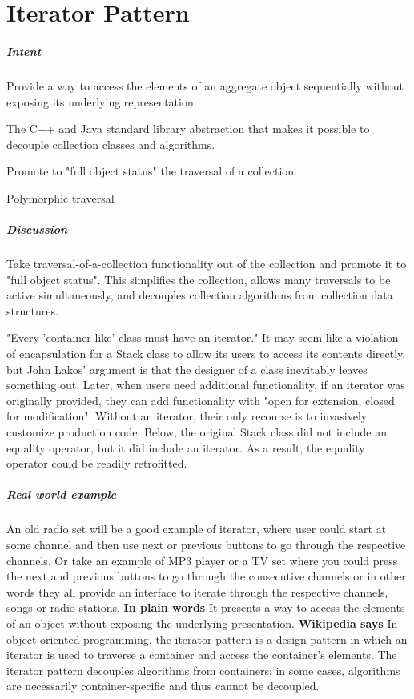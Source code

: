 \documentclass{book}
\begin{document}
\chapter{Iterator Pattern}\label{IteratorPattern}
\paragraph{Intent}

    Provide a way to access the elements of an aggregate object sequentially without exposing its underlying representation.

    The C++ and Java standard library abstraction that makes it possible to decouple collection classes and algorithms.

    Promote to "full object status" the traversal of a collection.

    Polymorphic traversal
\paragraph{Discussion}
Take traversal-of-a-collection functionality out of the collection and promote it to "full object status".
This simplifies the collection, allows many traversals to be active simultaneously, and decouples collection algorithms from collection data structures.

"Every 'container-like' class must have an iterator." It may seem like a violation of encapsulation for a Stack class 
to allow its users to access its contents directly, but John Lakos' argument is that the designer of a class inevitably leaves something out.
Later, when users need additional functionality, if an iterator was originally provided, they can add functionality with "open for extension, closed for modification".
Without an iterator, their only recourse is to invasively customize production code.
Below, the original Stack class did not include an equality operator, but it did include an iterator.
As a result, the equality operator could be readily retrofitted.

\paragraph{Real world example}
An old radio set will be a good example of iterator, where user could start at some channel and then use next or previous buttons to go through the respective channels.
Or take an example of MP3 player or a TV set where you could press the next and previous buttons to go through the consecutive channels or in other words they all
provide an interface to iterate through the respective channels, songs or radio stations.
\textbf{In plain words}
It presents a way to access the elements of an object without exposing the underlying presentation.
\textbf{Wikipedia says}
In object-oriented programming, the iterator pattern is a design pattern in which an iterator is used to traverse a container and access the container's elements.
The iterator pattern decouples algorithms from containers; in some cases, algorithms are necessarily container-specific and thus cannot be decoupled.
\end{document}
